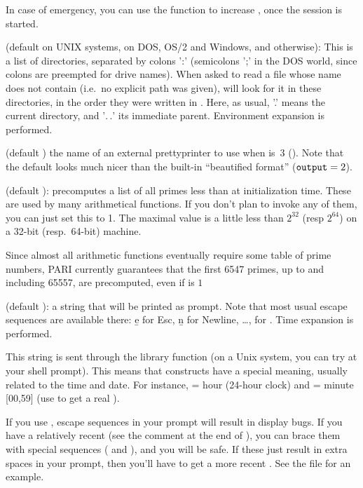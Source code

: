 In case of emergency, you can use the  function to
increase , once the session is started.

 (default  on UNIX systems,
 on DOS, OS/2 and Windows, and  otherwise):
This is a list of directories, separated by colons ':' (semicolons ';' in the
DOS world, since colons are preempted for drive names). When asked to read a
file whose name does not contain \kbd{/} (i.e.~no explicit path was given),
 will look for it in these directories, in the order they were written in
. Here, as usual, '.' means the current directory, and '$.\,.$' its
immediate parent. Environment expansion is performed.

 (default ) the name of an external prettyprinter to use when
 is~3 (). Note that the default
 looks much nicer than the built-in ``beautified
format'' (${\tt output} = 2$).

 (default ):  precomputes a list of
all primes less than  at initialization time. These are used
by many arithmetical functions. If you don't plan to invoke any of them, you
can just set this to 1. The maximal value is a little less than $2^32$
(resp $2^64$) on a 32-bit (resp.~64-bit) machine.

Since almost all arithmetic functions eventually require some table of prime
numbers, PARI currently guarantees that the first 6547 primes, up to and
including 65557, are precomputed, even if  is $1$

 (default ): a string that will be printed as
prompt. Note that most usual escape sequences are available there: \b{e} for
Esc, \b{n} for Newline, \dots, \kbd{\bs\bs} for \kbd{\bs}. Time expansion is
performed.

This string is sent through the library function  (on a
Unix system, you can try  at your shell prompt). This means
that \kbd{\%} constructs have a special meaning, usually related to the time
and date. For instance,  = hour (24-hour clock) and  =
minute [00,59] (use \kbd{\%\%} to get a real \kbd{\%}).

If you use , escape sequences in your prompt will result in
display bugs. If you have a relatively recent  (see the comment
at the end of ), you can brace them with special sequences
(\kbd{\bs[} and \kbd{\bs]}), and you will be safe. If these just result in
extra spaces in your prompt, then you'll have to get a more recent
. See the file  for an example.

